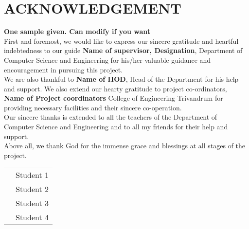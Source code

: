 \section*{\centering ACKNOWLEDGEMENT}
\textbf{One sample given. Can modify if you want} \\
First and foremost, we would like to express our sincere gratitude and heartful indebtedness to our guide \textbf{Name of supervisor, Designation}, Department of Computer Science and Engineering for his/her valuable guidance and encouragement in pursuing this project.\\
We are also thankful to \textbf{Name of HOD}, Head of the Department for his
help and support. We also extend our hearty gratitude to project co-ordinators, \textbf{Name of Project coordinators}
College of Engineering Trivandrum for providing necessary facilities and their sincere co-operation.\\
Our sincere thanks is extended to all the teachers of the Department of Computer Science and Engineering and to all my friends for their help and support.\\
Above all, we thank God for the immense grace and blessings at all stages of the project.\\

\begin{tabular}{ p{11cm} p{6cm} } 
    &  Student 1 \\ 
    &  Student 2 \\
    &  Student 3 \\
    &  Student 4 \\
\end{tabular}
\newpage
